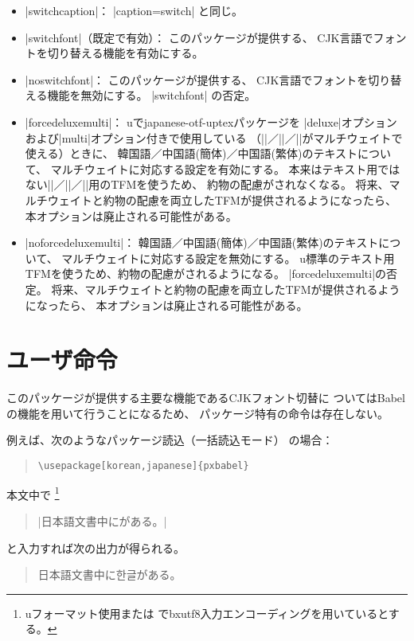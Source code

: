 \documentclass[a4paper,uplatex]{jsarticle}
\newcommand{\Pkg}[1]{\textsf{#1}}
\newcommand{\Means}{：\quad\inhibitglue}
\providecommand{\upTeX}{u\pTeX}
\providecommand{\upLaTeX}{u\pLaTeX}
\newcommand{\Kor}[1]{{\kanjishape{ko}\selectfont #1}}
\begin{document}
\begin{itemize}
\item |switchcaption|\Means
|caption=switch| と同じ。

\item |switchfont|（既定で有効）\Means
このパッケージが提供する、
CJK言語でフォントを切り替える機能を有効にする。

\item |noswitchfont|\Means
このパッケージが提供する、
CJK言語でフォントを切り替える機能を無効にする。
|switchfont| の否定。

\item |forcedeluxemulti|\Means
\upTeX で\Pkg{japanese-otf-uptex}パッケージを
|deluxe|オプションおよび|multi|オプション付きで使用している
（|\UTFK|／|\UTFC|／|\UTFT|がマルチウェイトで使える）ときに、
韓国語／中国語(簡体)／中国語(繁体)のテキストについて、
マルチウェイトに対応する設定を有効にする。
本来はテキスト用ではない|\UTFK|／|\UTFC|／|\UTFT|用のTFMを使うため、
約物の配慮がされなくなる。
将来、マルチウェイトと約物の配慮を両立したTFMが提供されるようになったら、
本オプションは廃止される可能性がある。

\item |noforcedeluxemulti|\Means
韓国語／中国語(簡体)／中国語(繁体)のテキストについて、
マルチウェイトに対応する設定を無効にする。
\upTeX 標準のテキスト用TFMを使うため、約物の配慮がされるようになる。
|forcedeluxemulti|の否定。
将来、マルチウェイトと約物の配慮を両立したTFMが提供されるようになったら、
本オプションは廃止される可能性がある。
\end{itemize}

\section{ユーザ命令}

このパッケージが提供する主要な機能であるCJKフォント切替に
ついてはBabelの機能を用いて行うことになるため、
パッケージ特有の命令は存在しない。

例えば、次のようなパッケージ読込（一括読込モード）
の場合：
\begin{quote}\begin{verbatim}
\usepackage[korean,japanese]{pxbabel}
\end{verbatim}\end{quote}
本文中で
\footnote{{\upLaTeX}フォーマット使用または
{\pLaTeX}で\Pkg{bxutf8}入力エンコーディングを用いているとする。}
\begin{quote}
|日本語文書中に\foregnlanguage{korean}{|%
\textgt{\Kor{한글}}|}がある。|
\end{quote} 
と入力すれば次の出力が得られる。
\begin{quote}
日本語文書中に\Kor{한글}がある。
\end{quote} 
\end{document}
